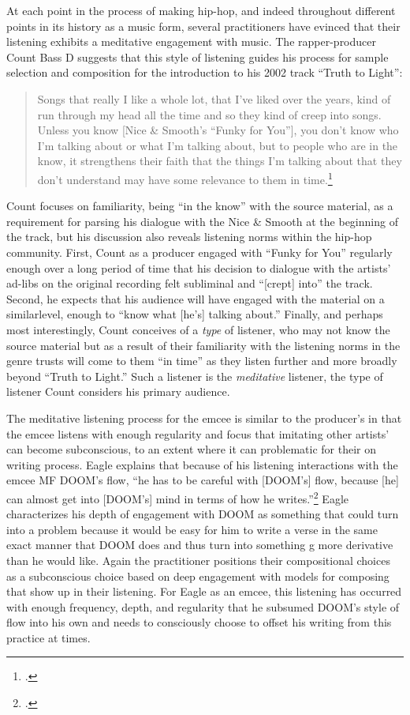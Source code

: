 At each point in the process of making hip-hop, and indeed throughout different points in its history as
a music form, several practitioners have evinced that their listening exhibits a meditative engagement with
music. The rapper-producer Count Bass D suggests that this style of listening guides his process for sample
selection and composition for the introduction to his 2002 track ``Truth to Light'': 
    \begin{quote}
        \small Songs that really I like a whole lot, that I've liked over the years, kind of run through my head all
        the time and so they kind of creep into songs. \textellipsis Unless you know [Nice \& Smooth's ``Funky
        for You''], you don't know who I'm talking about or what I'm talking about, but to people who are in
        the know, it strengthens their faith that the things I'm talking about that they don't understand may
        have some relevance to them in time.\footnote{
            \autocite[100]{mickeyhessHipHopDead2007}.}
    \end{quote}
Count focuses on familiarity, being ``in the know'' with the source material, as a requirement for parsing 
his dialogue with the Nice \& Smooth at the beginning of the track, but his discussion also reveals listening
norms within the hip-hop community. First, Count as a producer engaged with ``Funky for You'' regularly enough
over a long period of time that his decision to dialogue with the artists' ad-libs on the original recording 
felt subliminal and ``[crept] into'' the track. Second, he expects that his audience will have engaged with 
the material on a similarlevel, enough to ``know what [he's] talking about.'' Finally, and perhaps most 
interestingly, Count conceives of a \emph{type} of listener, who may not know the source material but as a
result of their familiarity with the listening norms in the genre trusts will come to them ``in time'' as
they listen further and more broadly beyond ``Truth to Light.'' Such a listener is the \emph{meditative} 
listener, the type of listener Count considers his primary audience.

The meditative listening process for the emcee is similar to the producer's in that the emcee listens with
enough regularity and focus that imitating other artists' can become subconscious, to an extent where it can
problematic for their on writing process. Eagle explains that because of his listening interactions with the
emcee MF DOOM's flow, ``he has to be  careful with [DOOM's] flow, because [he] can almost get into [DOOM's] 
mind in terms of how he writes.''\footnote{
    \cite{estellecaswellRappingDeconstructedBest2016}.} 
Eagle characterizes his depth of engagement with DOOM as something that could turn into a problem because 
it would be easy for him to write a verse in the same exact manner that DOOM does and thus turn into something
g more derivative than he would like. Again the practitioner positions their compositional choices as a 
subconscious choice based on deep engagement with models for composing that show up in their listening. For 
Eagle as an emcee, this listening has occurred with enough frequency, depth, and regularity that he subsumed
DOOM's style of flow into his own and needs to consciously choose to offset his writing from this practice 
at times.


